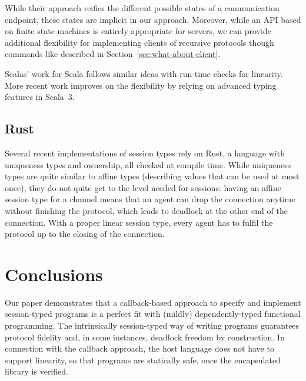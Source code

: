 \documentclass[acmsmall,screen]{acmart}
\begin{document}
While their approach reifies the different possible states of a
communication endpoint, these states are implicit in our
approach. Moreover, while an API based on finite state machines is
entirely appropriate for servers, we can provide additional
flexibility for implementing clients of recursive protocols though
commands like {\AUNROLL} described in
Section~\ref{sec:what-about-client}.

Scalas' work for Scala \cite{DBLP:conf/ecoop/ScalasY16} follows similar
ideas with run-time checks for linearity. More recent work
\cite{DBLP:conf/ecoop/CledouEJP22} improves on the flexibility by
relying on advanced typing features in Scala~3.

\subsection{Rust}
\label{sec:rust}



Several recent implementations of session types \cite{DBLP:conf/ecoop/ChenBT22,DBLP:conf/ecoop/LagaillardieNY22,DBLP:conf/ppopp/CutnerYV22,DBLP:conf/coordination/CutnerY21,DBLP:conf/coordination/LagaillardieNY20,DBLP:journals/corr/abs-1909-05970,DBLP:conf/icfp/JespersenML15} rely on Rust, a
language with uniqueness types and ownership, all checked at compile
time. While uniqueness types are quite similar to affine types
(describing values that can be used at most once), they do not quite
get to the level needed for sessions: having an affine session type
for a channel means that an agent can drop the connection anytime
without finishing the protocol, which leads to deadlock at the other
end of the connection. With a proper linear session type, every agent has to
fulfil the protocol up to the closing of the connection.


\section{Conclusions}
\label{sec:conclusions}

Our paper demonstrates that a callback-based approach to
specify and implement session-typed programs is a perfect fit with (mildly)
dependently-typed functional programming. The intrinsically
session-typed way of writing programs guarantees protocol fidelity and,
in some instances, deadlock freedom 
by construction. In connection with the callback approach, the host
language does not have to support linearity, so that programs are
statically safe, once the encapsulated library is verified.
\end{document}
